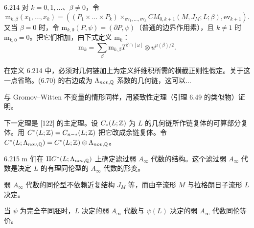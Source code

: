 \begin{definition}{6.214}
  对 $k=0,1,\dots$、$\beta\neq0$，令
  \[
    \mathrm{m}_{k,\beta}(x_1,\dots,x_k)=\left((P_1\times\dots\times P_k)\times_{\mathrm{ev}_1,\dots,\mathrm{ev}_k}CM_{0,k+1}(M,J_M;L;\beta),\mathrm{ev}_{k+1}\right).
  \]
  又当 $\beta=0$ 时，令 $\mathrm{m}_{k,0}(P,\psi)=(\partial P,\psi)$（普通的边界作用素），且 $k\neq1$ 时 $\mathrm{m}_{k,0}=0$。把它们相加，由下式定义 $\mathrm{m}_k$：
  \begin{equation}
    \mathrm{m}_k=\sum_\beta\mathrm{m}_{k,\beta}T^{\beta\cap[\omega]}\otimes u^{\mu(\beta)/2}. \tag{6.70}
  \end{equation}
\end{definition}

在定义 6.214 中，必须对几何链加上为定义纤维积所需的横截正则性假定。关于这一点省略。(6.70) 的右边成为 $\Lambda_{nov,\mathbb{Q}}$ 系数的几何链，这可以...

与 Gromov–Witten 不变量的情形同样，用紧致性定理（引理 6.49 的类似物）证明。

下一定理是 [122] 的主定理。设 $C_*(L;\mathbb{Z})$ 为 $L$ 的几何链所作链复体的可算部分复体。用 $C^*(L;\mathbb{Z})=C_{n-*}(L;\mathbb{Z})$ 把它改成余链复体。令 $C^*(L;\Lambda_{nov,\mathbb{Q}})=C^*(L;\mathbb{Z})\otimes\Lambda_{nov,\mathbb{Q}}$。

\begin{theorem}{6.215}
  $\mathrm{m}$ 们在 $\mathrm{II}C^*(L;\Lambda_{nov,\mathbb{Q}})$ 上确定滤过弱 $A_{\infty}$ 代数的结构。这个滤过弱 $A_{\infty}$ 代数是决定 $L$ 的有理同伦型的 $A_{\infty}$ 代数的形变。

  弱 $A_{\infty}$ 代数的同伦型不依赖近复结构 $J_M$ 等，而由辛流形 $M$ 与拉格朗日子流形 $L$ 决定。

  当 $\psi$ 为完全辛同胚时，$L$ 决定的弱 $A_{\infty}$ 代数与 $\psi(L)$ 决定的弱 $A_{\infty}$ 代数同伦等价。
\end{theorem}

